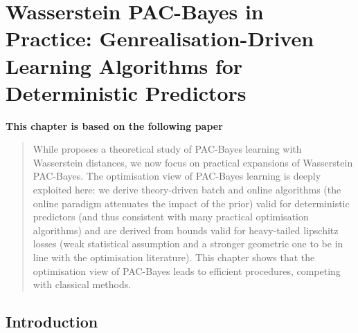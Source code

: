 \chapter[Wasserstein PAC-Bayes in Practice: Generalisation-Driven Learning Algorithms for Deterministic Predictors]{Wasserstein PAC-Bayes in Practice: Genrealisation-Driven Learning Algorithms for Deterministic Predictors}
\label{chap: wpb-practical}
\addchapterlof
\addchapterloe

\vspace{-2.0cm}
\begin{center}
\textbf{This chapter is based on the following paper}\\[-0.1cm]
\end{center}

\vspace{0.2cm}
\minitoc 

\begin{abstract}
\vspace{-0.2cm}
While  proposes a theoretical study of PAC-Bayes learning with Wasserstein distances, we now focus on practical expansions of Wasserstein PAC-Bayes. The optimisation view of PAC-Bayes learning is deeply exploited here: we derive theory-driven batch and online algorithms (the online paradigm attenuates the impact of the prior) valid for deterministic predictors (and thus consistent with many practical optimisation algorithms) and are derived from bounds valid for heavy-tailed lipschitz losses (weak statistical assumption and a stronger geometric one to be in line with the optimisation literature). This chapter shows that the optimisation view of PAC-Bayes leads to efficient procedures, competing with classical methods.
\end{abstract}

\newpage
    
\section{Introduction}

